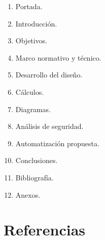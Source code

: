 \documentclass[
  spanish,
  letterpaper,
  DIV=11,
  numbers=noendperiod]{scrreprt}
\providecommand{\tightlist}{%
  \setlength{\itemsep}{0pt}\setlength{\parskip}{0pt}}
\begin{document}
\begin{enumerate}
\def\labelenumi{\arabic{enumi}.}
\tightlist
\item
  Portada.
\item
  Introducción.
\item
  Objetivos.
\item
  Marco normativo y técnico.
\item
  Desarrollo del diseño.
\item
  Cálculos.
\item
  Diagramas.
\item
  Análisis de seguridad.
\item
  Automatización propuesta.
\item
  Conclusiones.
\item
  Bibliografía.
\item
  Anexos.
\end{enumerate}


\chapter{Referencias}\label{referencias}

\protect{}\label{refs}
\end{document}
